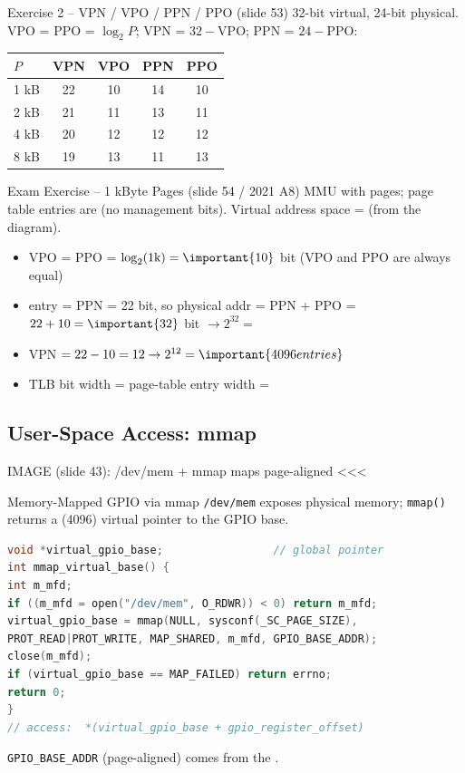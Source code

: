 \begin{example2}{Exercise 2 -- VPN / VPO / PPN / PPO (slide 53)}
    32-bit virtual, 24-bit physical. VPO = PPO = $\log_2 P$; VPN = $32-$VPO;
    PPN = $24-$PPO:
    \tcblower
    \begin{tabular}{l|c|c|c|c}
        $P$ & VPN & VPO & PPN & PPO \\\hline
        1 kB & 22 & 10 & 14 & 10 \\
        2 kB & 21 & 11 & 13 & 11 \\
        4 kB & 20 & 12 & 12 & 12 \\
        8 kB & 19 & 13 & 11 & 13 \\
    \end{tabular}
\end{example2}

\multend

\begin{example2}{Exam Exercise -- 1 kByte Pages (slide 54 / 2021 A8)}
    MMU with  pages; page table entries are 
    (no management bits). Virtual address space =  (from the diagram).
    \tcblower
    \begin{itemize}
        \item {} VPO = PPO = $\log_2(1\text{k}) = \important{10}$ bit
              (VPO and PPO are always equal)
        \item {} entry = PPN = 22 bit, so physical addr = PPN + PPO =
              $22+10 = \important{32}$ bit $\to 2^{32} = $ 
        \item {} VPN $= 22-10 = 12 \to 2^{12} = \important{4096 entries}$
        \item {} TLB bit width = page-table entry width = 
    \end{itemize}
\end{example2}

\raggedcolumns
\columnbreak

\subsection{User-Space Access: mmap}

IMAGE (slide 43): /dev/mem + mmap maps page-aligned <<<

\begin{KR}{Memory-Mapped GPIO via mmap}
    \texttt{/dev/mem} exposes physical memory; \texttt{mmap()} returns a
     (4096) virtual pointer to the GPIO base.
\begin{lstlisting}[language=C, style=basesmol, aboveskip=2pt, belowskip=2pt]
void *virtual_gpio_base;                 // global pointer
int mmap_virtual_base() {
int m_mfd;
if ((m_mfd = open("/dev/mem", O_RDWR)) < 0) return m_mfd;
virtual_gpio_base = mmap(NULL, sysconf(_SC_PAGE_SIZE),
PROT_READ|PROT_WRITE, MAP_SHARED, m_mfd, GPIO_BASE_ADDR);
close(m_mfd);
if (virtual_gpio_base == MAP_FAILED) return errno;
return 0;
}
// access:  *(virtual_gpio_base + gpio_register_offset)
\end{lstlisting}
    \texttt{GPIO\_BASE\_ADDR} (page-aligned) comes from the .
\end{KR}

